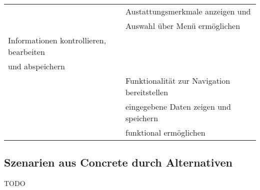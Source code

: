 \begin{table}[H]
\begin{tabular}{l l}
                                 & Austattungsmerkmale anzeigen und           \\[1ex]
                                 & Auswahl über Menü ermöglichen           \\[1ex]
Informationen kontrollieren, bearbeiten   &                                   \\[1ex]
und abspeichern                     &                                   \\[1ex]
                                 & Funktionalität zur Navigation bereitstellen   \\[1ex]
                                 & eingegebene Daten zeigen und speichern     \\[1ex]
                                 & funktional ermöglichen                  \\[1ex]



\hline
\end{tabular}
\label{tab:mietobjektAUC}
\end{table}



\subsection{Szenarien aus Concrete durch Alternativen}
TODO






